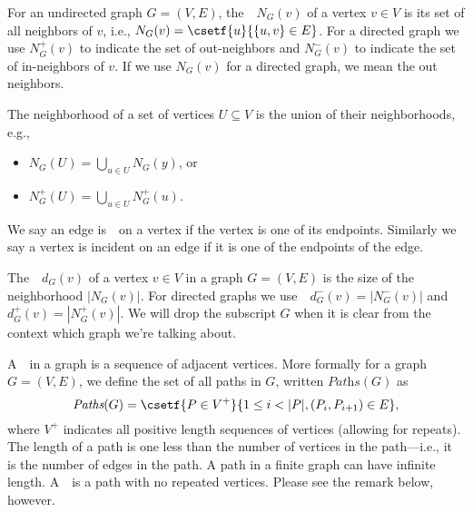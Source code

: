 \begin{definition}[Neighborhood]
For an undirected graph $G = (V,E)$, the~~$N_G(v)$ 
of a vertex $v \in V$ is its set of all neighbors of $v$, i.e.,
$N_G(v) = \csetf{u}{\{u,v\} \in E}$. 
For a directed graph we use $N_G^+(v)$ to indicate the set of 
out-neighbors and $N_G^-(v)$ to indicate the set of in-neighbors of
$v$.  If we use $N_G(v)$ for a directed graph, we mean the out 
neighbors.  

The neighborhood of a set of vertices $U \subseteq V$ is the union of
their neighborhoods, e.g.,

\begin{itemize}
\item  $N_G(U) = \bigcup_{u \in U} N_G(y)$, or
\item $N_G^+(U) = \bigcup_{u \in U} N_G^+(u)$.
\end{itemize}
\end{definition}

\begin{definition}[Incidence]
We say an edge is~~on a vertex if the vertex is one of
its endpoints.  Similarly we say a vertex is incident on an edge if it
is one of the endpoints of the edge.
\end{definition}

\begin{definition}[Degree]
 The~~$d_G(v)$ of a vertex $v \in V$ in a graph $G =
 (V,E)$ is the size of the neighborhood $|N_G(v)|$.  For directed
 graphs we use~~$d_G^-(v) = |N_G^-(v)|$
 and~~$d_G^+(v) = |N_G^+(v)|$.  We will drop the
 subscript $G$ when it is clear from the context which graph we're
 talking about.
\end{definition}

\begin{definition}[Path]
A~~in a graph is a sequence of adjacent vertices.  
%
More formally for a graph $G = (V,E)$, we define the set of all paths
in $G$, written $\textit{Paths}(G)$ as 
\[
\textit{Paths}(G) = \csetf{P
  \in V^+}{1 \leq i < |P|, (P_i, P_{i+1}) \in E},
\]
%
where $V^+$ indicates all positive length sequences of vertices
(allowing for repeats).
%
The length of a path is one less than the number of vertices in the
path---i.e., it is the number of edges in the path.  A path in a
finite graph can have infinite length.  A~~is a path
with no repeated vertices.  Please see the remark below, however.
\end{definition}

